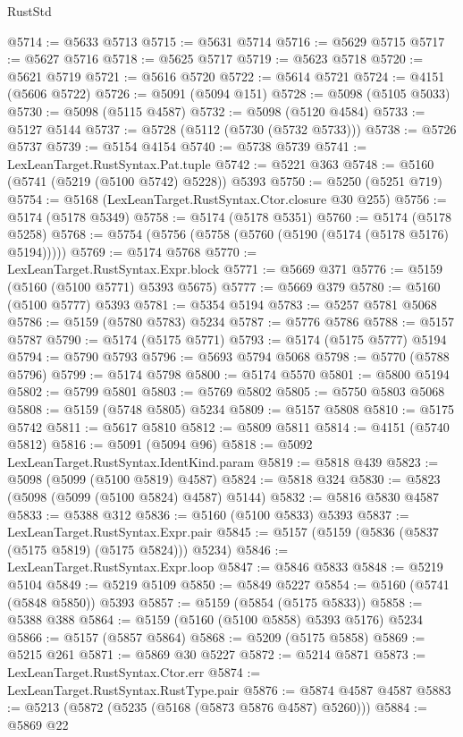 \begin{lexlean}{RustStd}
\begin{coremodule}
@5714 := @5633 @5713
@5715 := @5631 @5714
@5716 := @5629 @5715
@5717 := @5627 @5716
@5718 := @5625 @5717
@5719 := @5623 @5718
@5720 := @5621 @5719
@5721 := @5616 @5720
@5722 := @5614 @5721
@5724 := @4151 (@5606 @5722)
@5726 := @5091 (@5094 @151)
@5728 := @5098 (@5105 @5033)
@5730 := @5098 (@5115 @4587)
@5732 := @5098 (@5120 @4584)
@5733 := @5127 @5144
@5737 := @5728 (@5112 (@5730 (@5732 @5733)))
@5738 := @5726 @5737
@5739 := @5154 @4154
@5740 := @5738 @5739
@5741 := LexLeanTarget.RustSyntax.Pat.tuple
@5742 := @5221 @363
@5748 := @5160 (@5741 (@5219 (@5100 @5742) @5228)) @5393
@5750 := @5250 (@5251 @719)
@5754 := @5168 (LexLeanTarget.RustSyntax.Ctor.closure @30 @255)
@5756 := @5174 (@5178 @5349)
@5758 := @5174 (@5178 @5351)
@5760 := @5174 (@5178 @5258)
@5768 := @5754 (@5756 (@5758 (@5760 (@5190 (@5174 (@5178 @5176) @5194)))))
@5769 := @5174 @5768
@5770 := LexLeanTarget.RustSyntax.Expr.block
@5771 := @5669 @371
@5776 := @5159 (@5160 (@5100 @5771) @5393 @5675)
@5777 := @5669 @379
@5780 := @5160 (@5100 @5777) @5393
@5781 := @5354 @5194
@5783 := @5257 @5781 @5068
@5786 := @5159 (@5780 @5783) @5234
@5787 := @5776 @5786
@5788 := @5157 @5787
@5790 := @5174 (@5175 @5771)
@5793 := @5174 (@5175 @5777) @5194
@5794 := @5790 @5793
@5796 := @5693 @5794 @5068
@5798 := @5770 (@5788 @5796)
@5799 := @5174 @5798
@5800 := @5174 @5570
@5801 := @5800 @5194
@5802 := @5799 @5801
@5803 := @5769 @5802
@5805 := @5750 @5803 @5068
@5808 := @5159 (@5748 @5805) @5234
@5809 := @5157 @5808
@5810 := @5175 @5742
@5811 := @5617 @5810
@5812 := @5809 @5811
@5814 := @4151 (@5740 @5812)
@5816 := @5091 (@5094 @96)
@5818 := @5092 LexLeanTarget.RustSyntax.IdentKind.param
@5819 := @5818 @439
@5823 := @5098 (@5099 (@5100 @5819) @4587)
@5824 := @5818 @324
@5830 := @5823 (@5098 (@5099 (@5100 @5824) @4587) @5144)
@5832 := @5816 @5830 @4587
@5833 := @5388 @312
@5836 := @5160 (@5100 @5833) @5393
@5837 := LexLeanTarget.RustSyntax.Expr.pair
@5845 := @5157 (@5159 (@5836 (@5837 (@5175 @5819) (@5175 @5824))) @5234)
@5846 := LexLeanTarget.RustSyntax.Expr.loop
@5847 := @5846 @5833
@5848 := @5219 @5104
@5849 := @5219 @5109
@5850 := @5849 @5227
@5854 := @5160 (@5741 (@5848 @5850)) @5393
@5857 := @5159 (@5854 (@5175 @5833))
@5858 := @5388 @388
@5864 := @5159 (@5160 (@5100 @5858) @5393 @5176) @5234
@5866 := @5157 (@5857 @5864)
@5868 := @5209 (@5175 @5858)
@5869 := @5215 @261
@5871 := @5869 @30 @5227
@5872 := @5214 @5871
@5873 := LexLeanTarget.RustSyntax.Ctor.err
@5874 := LexLeanTarget.RustSyntax.RustType.pair
@5876 := @5874 @4587 @4587
@5883 := @5213 (@5872 (@5235 (@5168 (@5873 @5876 @4587) @5260)))
@5884 := @5869 @22

\end{coremodule}
\end{lexlean}
